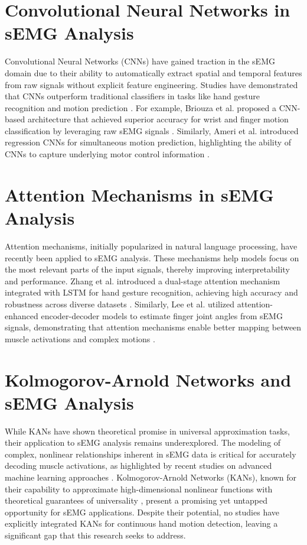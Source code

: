 \section{Convolutional Neural Networks in sEMG Analysis}
Convolutional Neural Networks (CNNs) have gained traction in the sEMG domain due to their ability to automatically extract spatial and temporal features from raw signals without explicit feature engineering. Studies have demonstrated that CNNs outperform traditional classifiers in tasks like hand gesture recognition and motion prediction \cite{briouza2021convolutional,ameri2019regression, zia2018multiday}. For example, Briouza et al. proposed a CNN-based architecture that achieved superior accuracy for wrist and finger motion classification by leveraging raw sEMG signals \cite{briouza2021convolutional}. Similarly, Ameri et al. introduced regression CNNs for simultaneous motion prediction, highlighting the ability of CNNs to capture underlying motor control information \cite{ameri2019regression}.

\section{Attention Mechanisms in sEMG Analysis}
Attention mechanisms, initially popularized in natural language processing, have recently been applied to sEMG analysis. These mechanisms help models focus on the most relevant parts of the input signals, thereby improving interpretability and performance. Zhang et al. introduced a dual-stage attention mechanism integrated with LSTM for hand gesture recognition, achieving high accuracy and robustness across diverse datasets \cite{zhang2023lstm}. Similarly, Lee et al. utilized attention-enhanced encoder-decoder models to estimate finger joint angles from sEMG signals, demonstrating that attention mechanisms enable better mapping between muscle activations and complex motions \cite{lee2022explainable}.

\section{Kolmogorov-Arnold Networks and sEMG Analysis}
While KANs have shown theoretical promise in universal approximation tasks, their application to sEMG analysis remains underexplored. The modeling of complex, nonlinear relationships inherent in sEMG data is critical for accurately decoding muscle activations, as highlighted by recent studies on advanced machine learning approaches \cite{farago2022review}. Kolmogorov-Arnold Networks (KANs), known for their capability to approximate high-dimensional nonlinear functions with theoretical guarantees of universality \cite{liu2024kan}, present a promising yet untapped opportunity for sEMG applications. Despite their potential, no studies have explicitly integrated KANs for continuous hand motion detection, leaving a significant gap that this research seeks to address.

